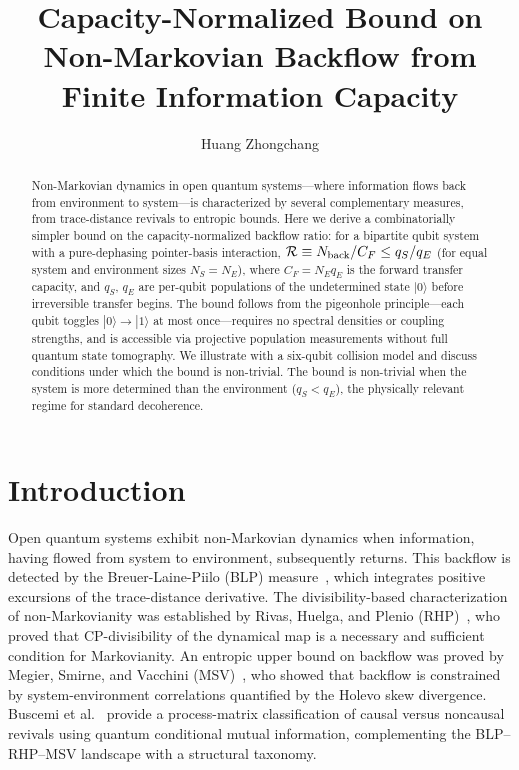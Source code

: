 \documentclass[aps,pra,twocolumn,superscriptaddress,hyperref]{revtex4-2}
\begin{document}
\title{Capacity-Normalized Bound on Non-Markovian Backflow from Finite Information Capacity}

\author{Huang Zhongchang}

\begin{abstract}
Non-Markovian dynamics in open quantum systems---where information flows back from environment to system---is characterized by several complementary measures, from trace-distance revivals to entropic bounds. Here we derive a combinatorially simpler bound on the capacity-normalized backflow ratio: for a bipartite qubit system with a pure-dephasing pointer-basis interaction, $\mathcal{R} \equiv N_{\rm back}/C_F \leq q_S/q_E$ (for equal system and environment sizes $N_S=N_E$), where $C_F = N_E q_E$ is the forward transfer capacity, and $q_S$, $q_E$ are per-qubit populations of the undetermined state $|0\rangle$ before irreversible transfer begins. The bound follows from the pigeonhole principle---each qubit toggles $|0\rangle \to |1\rangle$ at most once---requires no spectral densities or coupling strengths, and is accessible via projective population measurements without full quantum state tomography. We illustrate with a six-qubit collision model and discuss conditions under which the bound is non-trivial. The bound is non-trivial when the system is more determined than the environment ($q_S < q_E$), the physically relevant regime for standard decoherence.
\end{abstract}

\maketitle

\section{Introduction}

Open quantum systems exhibit non-Markovian dynamics when information, having flowed from system to environment, subsequently returns. This backflow is detected by the Breuer-Laine-Piilo (BLP) measure~\cite{Breuer:2009}, which integrates positive excursions of the trace-distance derivative. The divisibility-based characterization of non-Markovianity was established by Rivas, Huelga, and Plenio (RHP)~\cite{Rivas:2010}, who proved that CP-divisibility of the dynamical map is a necessary and sufficient condition for Markovianity. An entropic upper bound on backflow was proved by Megier, Smirne, and Vacchini (MSV)~\cite{Megier:2021}, who showed that backflow is constrained by system-environment correlations quantified by the Holevo skew divergence. Buscemi et al.~\cite{Buscemi:2025} provide a process-matrix classification of causal versus noncausal revivals using quantum conditional mutual information, complementing the BLP--RHP--MSV landscape with a structural taxonomy.
\end{document}
